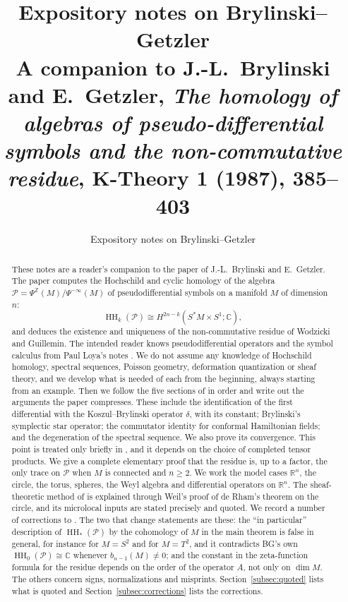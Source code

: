 \documentclass[11pt,oneside,reqno]{article}
\title{Expository notes on Brylinski--Getzler\\[4pt]
\large A companion to J.-L.~Brylinski and E.~Getzler, \emph{The homology of
algebras of pseudo-differential symbols and the non-commutative residue},
K-Theory \textbf{1} (1987), 385--403}
\author{Expository notes on Brylinski--Getzler}
\date{}
\DeclareMathOperator{\HH}{HH}
\newcommand{\C}{\mathbb C}
\newcommand{\R}{\mathbb R}
\newcommand{\Z}{\mathbb Z}
\newcommand{\cP}{\mathcal P}
\theoremstyle{plain}
\theoremstyle{definition}
\theoremstyle{remark}
\begin{document}
\hypersetup{pageanchor=false}
\maketitle
\thispagestyle{empty}
\clearpage
\hypersetup{pageanchor=true}
\begingroup
\small
\tableofcontents
\endgroup
\clearpage
\listoffigures
\clearpage
{}
\setcounter{page}{1}

\begin{abstract}
These notes are a reader's companion to the paper \cite{BG} of
J.-L.~Brylinski and E.~Getzler. The paper computes the Hochschild and
cyclic homology of the algebra \(\cP=\Psi^{\Z}(M)/\Psi^{-\infty}(M)\) of
pseudodifferential symbols on a manifold \(M\) of dimension \(n\):
\[
 \HH_k(\cP)\cong H^{2n-k}(S^*M\times S^1;\C),
\]
and deduces the existence and uniqueness of the non-commutative residue of
Wodzicki and Guillemin. The intended reader knows pseudodifferential
operators and the symbol calculus from Paul Loya's notes
\cite{LoyaAS,LoyaB}. We do not assume any knowledge of Hochschild
homology, spectral sequences, Poisson geometry, deformation quantization
or sheaf theory, and we develop what is needed of each from the beginning,
always starting from an example. Then we follow the five sections of
\cite{BG} in order and write out the arguments the paper compresses. These
include the identification of the first differential with the
Koszul--Brylinski operator \(\delta\), with its constant; Brylinski's
symplectic star operator; the commutator identity for conformal
Hamiltonian fields; and the degeneration of the spectral sequence. We
also prove its convergence. This point is treated only briefly in
\cite{BG}, and it depends on the choice of completed tensor products. We
give a complete elementary proof that the residue is, up to a factor, the
only trace on \(\cP\) when \(M\) is connected and \(n\ge2\). We work the
model cases \(\R^n\), the circle, the torus, spheres, the Weyl algebra and
differential operators on \(\R^n\). The sheaf-theoretic method of
\cite[\S5]{BG} is explained through Weil's proof of de Rham's theorem on
the circle, and its microlocal inputs are stated precisely and quoted. We
record a number of corrections to \cite{BG}. The two that change
statements are these: the ``in particular'' description of
\(\HH_*(\cP)\) by the cohomology of \(M\) in the main theorem is false in
general, for instance for \(M=S^2\) and for \(M=T^2\), and it contradicts BG's own
\(\HH_0(\cP)\cong\C\) whenever \(b_{n-1}(M)\ne0\); and the constant in the
zeta-function formula for the residue depends on the order of the
operator \(A\), not only on \(\dim M\). The others concern signs,
normalizations and misprints. Section~\ref{subsec:quoted} lists what is
quoted and Section~\ref{subsec:corrections} lists the corrections.
\end{abstract}
\end{document}
